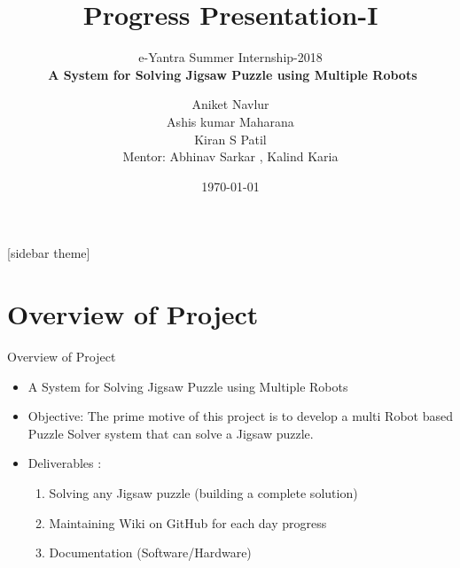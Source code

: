 \documentclass[10pt, a4paper]{beamer}
\begin{document}
	\title{Progress Presentation-I}
	\subtitle{e-Yantra Summer Internship-2018 \\ $ $\textbf{ A System for Solving Jigsaw Puzzle using Multiple Robots}$ $}
	\author{$ $Aniket Navlur$ $\\$ $Ashis kumar Maharana$ $\\$ $Kiran S Patil$ $\\
	Mentor: $ $Abhinav Sarkar , Kalind Karia$ $}
	\date{\today}
	\frame{\titlepage}

[sidebar theme]
\section{Overview of Project}
\begin{frame}{Overview of Project}
	
	\begin{itemize}
		\item A System for Solving Jigsaw Puzzle using Multiple Robots
		\item Objective: The prime motive of this project is to develop a multi Robot based Puzzle Solver system that can solve a Jigsaw puzzle.
		\item Deliverables : \begin{enumerate}
		\item  Solving any Jigsaw puzzle (building a complete solution) 
		\item 	Maintaining Wiki on GitHub for each day progress 
		\item 	Documentation (Software/Hardware) 
		\end{enumerate}
	\end{itemize}
\end{frame}
\end{document}
